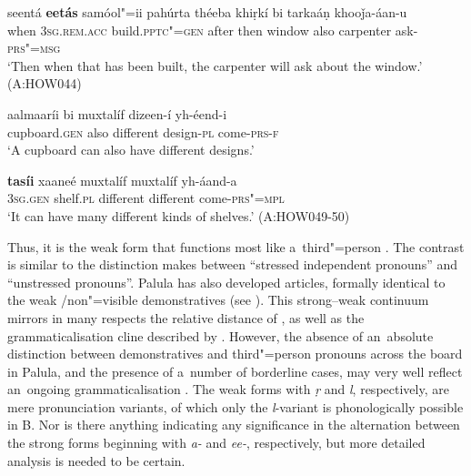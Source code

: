 \begin{exe}
\ex
\label{ex:5-16}
\gll seentá \textbf{eetás} samóol"=ii pahúrta théeba khiṛkí bi tarkaáṇ
khooǰa-áan-u\\
when \textsc{3sg}.\textsc{rem.acc} build.\textsc{pptc"=gen} after then window also carpenter ask-\textsc{prs"=msg} \\
\glt `Then when that has been built, the carpenter will ask about the window.' (A:HOW044)
\end{exe}


\begin{exe}
\ex
\label{ex:5-17}
\gll aalmaaríi bi muxtalíf dizeen-í yh-éend-i\\
cupboard.\textsc{gen} also different design-\textsc{pl} come-\textsc{prs-f}\\
\glt `A cupboard can also have different designs.' 

\gll \textbf{tasíi} xaaneé muxtalíf muxtalíf yh-áand-a \\
\textsc{3sg.gen} shelf.\textsc{pl} different different come-\textsc{prs"=mpl} \\
\glt `It can have many different kinds of shelves.' (A:HOW049-50)
\end{exe}

Thus, it is the weak form that functions most like a~third"=person . The contrast is similar to the distinction \citet[417--419]{givon2001a} makes between ``stressed independent pronouns'' and ``unstressed  pronouns''. Palula has also developed  articles, formally identical to the  weak /non"=visible demonstratives (see ). This strong--weak continuum mirrors in many respects the relative  distance of \citet[419]{givon2001a}, as well as the grammaticalisation cline described by \citet[432]{diessel2006}. However, the absence of an~absolute distinction between demonstratives and third"=person pronouns across the board in Palula, and the presence of a~number of borderline cases, may very well reflect an~ongoing grammaticalisation \citep[213]{himmelmann1996}. The weak  forms with \textit{ṛ} and \textit{l}, respectively, are mere pronunciation variants, of which only the \textit{l}-variant is phonologically possible in B. Nor is there anything indicating any significance in the alternation between the strong  forms beginning with \textit{a-} and \textit{ee-}, respectively, but more detailed analysis is needed to be certain.




